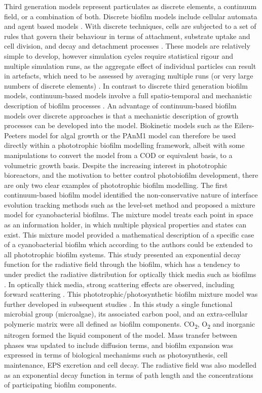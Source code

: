 Third generation models represent particulates as discrete elements, a continuum field, or a combination of both. Discrete biofilm models include cellular automata and agent based models \cite{skoneczny2015}. 
With discrete techniques, cells are subjected to a set of rules that govern their behaviour in terms of attachment, substrate uptake and cell division, and decay and detachment processes \cite{skoneczny2015}. 
These models are relatively simple to develop, however simulation cycles require statistical rigour and multiple simulation runs, as the aggregate effect of individual particles can result in artefacts, which need to be assessed by averaging multiple runs (or very large numbers of discrete elements) \cite{dacunto2017}. 
In contrast to discrete third generation biofilm models, continuum-based models involve a full spatio-temporal and mechanistic description of biofilm processes \cite{eberl2001}. 
An advantage of continuum-based biofilm models over discrete approaches is that a mechanistic description of growth processes can be developed into the model.
Biokinetic models such as the Eilers-Peeters model for algal growth \cite{eilers1988} or the PAnM1 model \cite{puyol2017} can therefore be used directly within a phototrophic biofilm modelling framework, albeit with some manipulations to convert the model from a COD or equivalent basis, to a volumetric growth basis. 
\skippingparagraph
Despite the increasing interest in phototrophic bioreactors, and the motivation to better control photobiofilm development, there are only two clear examples of phototrophic biofilm modelling. 
The first continuum-based biofilm model \cite{clarelli2013} identified the non-conservative nature of interface evolution tracking methods such as the level-set method \cite{alpkvist2007} and proposed a mixture model for cyanobacterial biofilms. 
The mixture model treats each point in space as an information holder, in which multiple physical properties and states can exist. 
This mixture model provided a mathematical description of a specific case of a cyanobacterial biofilm which according to the authors could be extended to all phototrophic biofilm systems. 
This study presented an exponential decay function for the radiative field through the biofilm, which has a tendency to under predict the radiative distribution for optically thick media such as biofilms \cite{jarosz2008}. 
In optically thick media, strong scattering effects are observed, including forward scattering \cite{jarosz2008}. 
This phototrophic/photosynthetic biofilm mixture model was further developed in subsequent studies \cite{polizzi2017}. In this study a single functional microbial group (microalgae), its associated carbon pool, and an extra-cellular polymeric matrix were all defined as biofilm components. CO\textsubscript{2}, O\textsubscript{2} and inorganic nitrogen formed the liquid component of the model. Mass transfer between phases was updated to include diffusion terms, and biofilm expansion was expressed in terms of biological mechanisms such as photosynthesis, cell maintenance, EPS excretion and cell decay. 
The radiative field was also modelled as an exponential decay function in terms of path length and the concentrations of participating biofilm components.
\skippingparagraph

